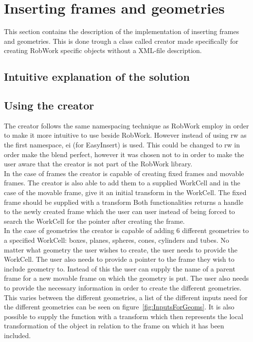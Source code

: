 \section{Inserting frames and geometries}
This section contains the description of the implementation of inserting frames and geometries. This is done trough a class called creator made specifically for creating RobWork specific objects without a XML-file description.

\subsection{Intuitive explanation of the solution}

\subsection{Using the creator}
The creator follows the same namespacing technique as RobWork employ in order to make it more intuitive to use beside RobWork. However instead of using rw as the first namespace, ei (for EasyInsert) is used. This could be changed to rw in order make the blend perfect, however it was chosen not to in order to make the user aware that the creator is not part of the RobWork library.\\

In the case of frames the creator is capable of creating fixed frames and movable frames. The creator is also able to add them to a supplied WorkCell and in the case of the movable frame, give it an initial transform in the WorkCell. The fixed frame should be supplied with a transform 
Both functionalities returns a handle to the newly created frame which the user can user instead of being forced to search the WorkCell for the pointer after creating the frame.\\

In the case of geometries the creator is capable of adding 6 different geometries to a specified WorkCell: boxes, planes, spheres, cones, cylinders and tubes. No matter what geometry the user wishes to create, the user needs to provide the WorkCell. The user also needs to provide a pointer to the frame they wish to include geometry to. Instead of this the user can supply the name of a parent frame for a new movable frame on which the geometry is put. The user also needs to provide the necessary information in order to create the different geometries. This varies between the different geometries, a list of the different inputs need for the different geometries can be seen on figure~\ref{fig:InputsForGeoms}. It is also possible to supply the function with a transform which then represents the local transformation of the object in relation to the frame on which it has been included.\\

